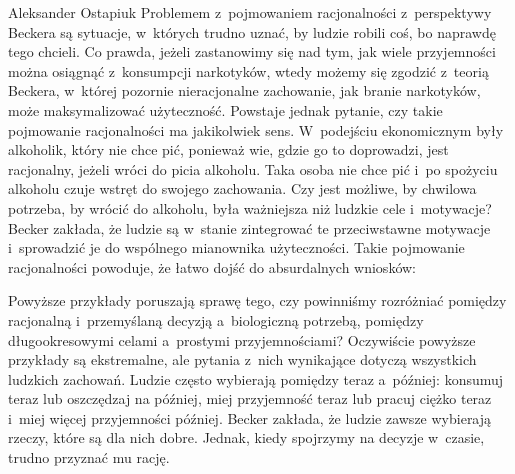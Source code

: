 \begin{artplenv}{Aleksander Ostapiuk}
Problemem z~pojmowaniem racjonalności z~perspektywy Beckera są sytuacje, w~których trudno uznać, by ludzie robili coś, bo
naprawdę tego chcieli. Co prawda, jeżeli zastanowimy się nad tym, jak wiele przyjemności można osiągnąć z~konsumpcji
narkotyków, wtedy możemy się zgodzić z~teorią Beckera, w~której pozornie nieracjonalne zachowanie, jak branie
narkotyków, może maksymalizować użyteczność. Powstaje jednak pytanie, czy takie pojmowanie racjonalności ma jakikolwiek
sens. W~podejściu ekonomicznym były alkoholik, który nie chce pić, ponieważ wie, gdzie go to doprowadzi, jest
racjonalny, jeżeli wróci do picia alkoholu. Taka osoba nie chce pić i~po spożyciu alkoholu czuje wstręt do swojego zachowania. Czy
jest możliwe, by chwilowa potrzeba, by wrócić do alkoholu, była ważniejsza niż ludzkie cele i~motywacje? Becker
zakłada, że ludzie są w~stanie zintegrować te przeciwstawne motywacje i~sprowadzić je do wspólnego mianownika
użyteczności. Takie pojmowanie racjonalności powoduje, że łatwo dojść do absurdalnych wniosków: 


Powyższe przykłady poruszają sprawę tego, czy powinniśmy rozróżniać pomiędzy racjonalną i~przemyślaną
decyzją a~biologiczną potrzebą, pomiędzy długookresowymi celami a~prostymi przyjemnościami? Oczywiście powyższe przykłady są
ekstremalne, ale pytania z~nich wynikające dotyczą wszystkich ludzkich zachowań. Ludzie często wybierają pomiędzy teraz
a~później: konsumuj teraz lub oszczędzaj na później, miej przyjemność teraz lub pracuj ciężko teraz i~miej więcej
przyjemności później. Becker zakłada, że ludzie zawsze wybierają rzeczy, które są dla nich dobre. Jednak, kiedy
spojrzymy na decyzje w~czasie, trudno przyznać mu rację. 


\end{artplenv}
